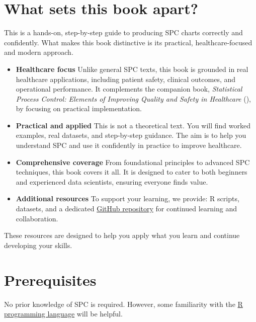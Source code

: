 \documentclass[
]{book}
\begin{document}
\section*{What sets this book apart?}\label{what-sets-this-book-apart}

This is a hands-on, step-by-step guide to producing SPC charts correctly
and confidently. What makes this book distinctive is its practical,
healthcare-focused and modern approach.

\begin{itemize}
\item
  \textbf{Healthcare focus} Unlike general SPC texts, this book is
  grounded in real healthcare applications, including patient safety,
  clinical outcomes, and operational performance. It complements the
  companion book, \emph{Statistical Process Control: Elements of
  Improving Quality and Safety in Healthcare}
  (), by focusing on practical
  implementation.
\item
  \textbf{Practical and applied} This is not a theoretical text. You
  will find worked examples, real datasets, and step-by-step guidance.
  The aim is to help you understand SPC and use it confidently in
  practice to improve healthcare.
\item
  \textbf{Comprehensive coverage} From foundational principles to
  advanced SPC techniques, this book covers it all. It is designed to
  cater to both beginners and experienced data scientists, ensuring
  everyone finds value.
\item
  \textbf{Additional resources} To support your learning, we provide: R
  scripts, datasets, and a dedicated
  \href{https://github.com/anhoej/spc4hc}{GitHub repository} for
  continued learning and collaboration.
\end{itemize}

These resources are designed to help you apply what you learn and
continue developing your skills.

\section*{Prerequisites}\label{prerequisites}

No prior knowledge of SPC is required. However, some familiarity with
the \href{https://www.r-project.org/}{R programming language} will be
helpful.
\end{document}
